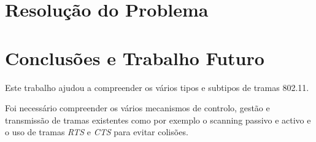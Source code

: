\documentclass[a4paper]{article}
\begin{document}
\pagebreak
\section{Resolução do Problema}

\pagebreak
\section{Conclusões e Trabalho Futuro}

Este trabalho ajudou a compreender os vários tipos e subtipos de tramas 802.11.

Foi necessário compreender os vários mecanismos de controlo, gestão e transmissão de tramas existentes como por exemplo o scanning passivo e activo e o uso de tramas \textit{RTS} e \textit{CTS} para evitar colisões.
\end{document}
